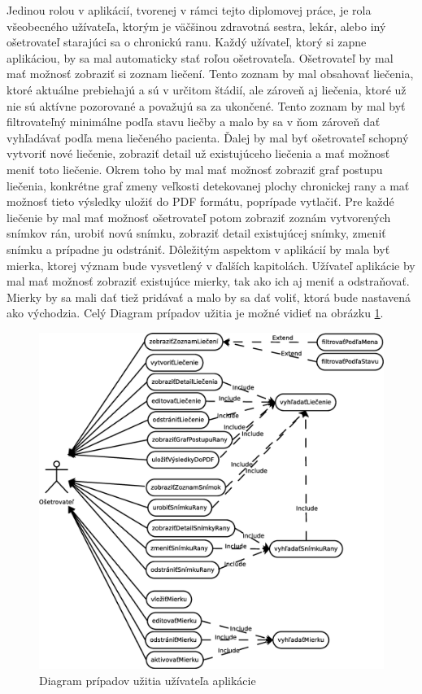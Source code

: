 Jedinou rolou v aplikácií, tvorenej v rámci tejto diplomovej práce, je rola všeobecného užívateľa, ktorým je väčšinou zdravotná sestra, lekár, alebo iný ošetrovateľ starajúci sa o chronickú ranu. Každý užívateľ, ktorý si zapne aplikáciou, by sa mal automaticky stať roľou ošetrovateľa. Ošetrovateľ by mal mať možnosť zobraziť si zoznam liečení. Tento zoznam by mal obsahovať liečenia, ktoré aktuálne prebiehajú a sú v určitom štádií, ale zároveň aj liečenia, ktoré už nie sú aktívne pozorované a považujú sa za ukončené. Tento zoznam by mal byť filtrovateľný minimálne podľa stavu liečby a malo by sa v ňom zároveň dať vyhľadávať podľa mena liečeného pacienta. Ďalej by mal byť ošetrovateľ schopný vytvoriť nové liečenie, zobraziť detail už existujúceho liečenia a mať možnosť meniť toto liečenie. Okrem toho by mal mať možnosť zobraziť graf postupu liečenia, konkrétne graf zmeny veľkosti detekovanej plochy chronickej rany a mať možnosť tieto výsledky uložiť do PDF formátu, poprípade vytlačiť. Pre každé liečenie by mal mať možnosť ošetrovateľ potom zobraziť zoznám vytvorených snímkov rán, urobiť novú snímku, zobraziť detail existujúcej snímky, zmeniť snímku a prípadne ju odstrániť. Dôležitým aspektom v aplikácií by mala byť mierka, ktorej význam bude vysvetlený v ďalších kapitolách. Užívateľ aplikácie by mal mať možnosť zobraziť existujúce mierky, tak ako ich aj meniť a odstraňovať. Mierky by sa mali dať tiež pridávať a malo by sa dať voliť, ktorá bude nastavená ako východzia. Celý Diagram prípadov užitia je možné vidieť na obrázku \ref{fig:usecase}.
\begin{figure}[h]
      \centering
      \includegraphics[scale=0.420]{fig/use-case.eps}
      \caption{Diagram prípadov užitia užívateľa aplikácie}
      \label{fig:usecase}
\end{figure}

